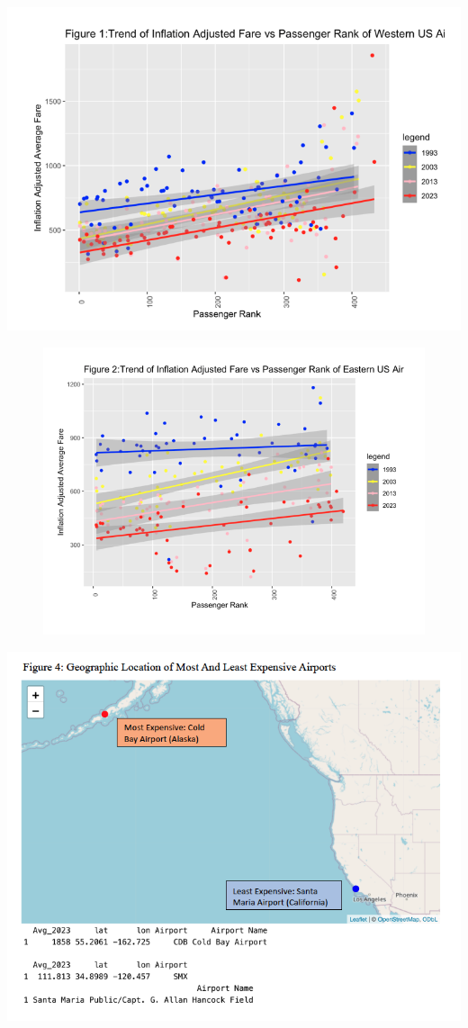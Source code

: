 \documentclass[
  letterpaper,
  DIV=11,
  numbers=noendperiod]{scrartcl}
\begin{document}
\includegraphics{images/Fig1-01.png}

\begin{figure}

{\centering \includegraphics{images/Fig2-01.png}

}

\end{figure}

\includegraphics{images/Fig4-01.png}
\end{document}
